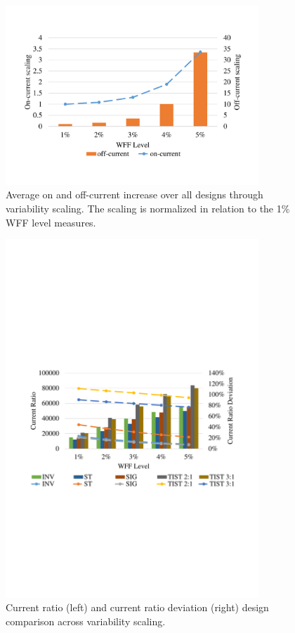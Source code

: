 \documentclass[diss,pgmicro,english]{iiufrgs}
\begin{document}
    \begin{figure}[h]
        \centering
            \includegraphics[width=0.85\textwidth, trim={1.25cm 3cm 2cm 3cm}, clip]{on-off-scaling2.pdf}
            \caption{Average on and off-current increase over all designs through variability scaling. The scaling is normalized in relation to the 1\% WFF level measures.}
        \label{figOnOffScal}
    \end{figure}

    \begin{figure}[H]
        \centering
            \includegraphics[width=0.85\textwidth, trim={1.25cm 9cm 2cm 10cm}, clip]{currRatioWFF.pdf}
            \caption{Current ratio (left) and current ratio deviation (right) design comparison across variability scaling.}
        \label{figsCurrComp}
    \end{figure}
\end{document}

